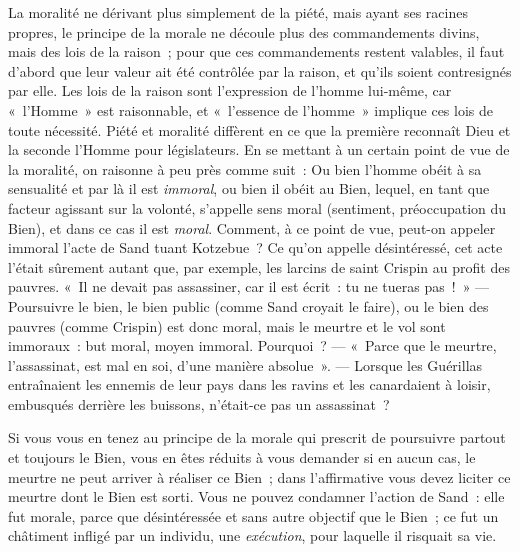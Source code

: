 \documentclass[french,twoside]{book} %
\begin{document}
La moralité ne dérivant plus simplement de la piété, mais ayant ses racines propres, le principe de la morale ne découle plus des commandements divins, mais des lois de la raison ; pour que ces commandements restent valables, il faut d’abord que leur valeur ait été contrôlée par la raison, et qu’ils soient contresignés par elle. Les lois de la raison sont l’expression de l’homme lui-même, car « l’Homme » est raisonnable, et « l’essence de l’homme » implique ces lois de toute nécessité. Piété et moralité diffèrent en ce que la première reconnaît Dieu et la seconde l’Homme pour législateurs. En se mettant à un certain point de vue de la moralité, on raisonne à peu près comme suit : Ou bien l’homme obéit à sa sensualité  et par là il est \emph{immoral}, ou bien il obéit au Bien, lequel, en tant que facteur agissant sur la volonté, s’appelle sens moral (sentiment, préoccupation du Bien), et dans ce cas il est \emph{moral}. Comment, à ce point de vue, peut-on appeler immoral l’acte de Sand tuant Kotzebue ? Ce qu’on appelle désintéressé, cet acte l’était sûrement autant que, par exemple, les larcins de saint Crispin au profit des pauvres. « Il ne devait pas assassiner, car il est écrit : tu ne tueras pas ! » — Poursuivre le bien, le bien public (comme Sand croyait le faire), ou le bien des pauvres (comme Crispin) est donc moral, mais le meurtre et le vol sont immoraux : but moral, moyen immoral. Pourquoi ? — « Parce que le meurtre, l’assassinat, est mal en soi, d’une manière absolue ». — Lorsque les Guérillas entraînaient les ennemis de leur pays dans les ravins et les canardaient à loisir, embusqués derrière les buissons, n’était-ce pas un assassinat ?\par
Si vous vous en tenez au principe de la morale qui prescrit de poursuivre partout et toujours le Bien, vous en êtes réduits à vous demander si en aucun cas, le meurtre ne peut arriver à réaliser ce Bien ; dans l’affirmative vous devez liciter ce meurtre dont le Bien est sorti. Vous ne pouvez condamner l’action de Sand : elle fut morale, parce que désintéressée et sans autre objectif que le Bien ; ce fut un châtiment infligé par un individu, une \emph{exécution}, pour laquelle il risquait sa vie.\par
\end{document}
